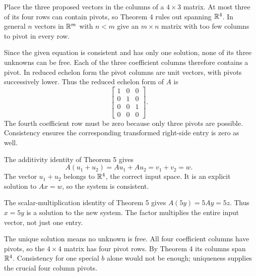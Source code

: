 Place the three proposed vectors in the columns of a $4\times3$
matrix. At most three of its four rows can contain pivots, so Theorem 4
rules out spanning $\mathbb{R}^4$. In general $n$ vectors in $\mathbb{R}^m$ with
$n<m$ give an $m\times n$ matrix with too few columns to pivot in
every row.

Since the given equation is consistent and has only one solution,
none of its three unknowns can be free. Each of the three coefficient
columns therefore contains a pivot. In reduced echelon form the
pivot columns are unit vectors, with pivots successively lower.
Thus the reduced echelon form of $A$ is
\[\begin{bmatrix}1&0&0\\0&1&0\\0&0&1\\0&0&0\end{bmatrix}.\]
The fourth coefficient row must be zero because only three pivots
are possible. Consistency ensures the corresponding transformed
right-side entry is zero as well.

The additivity identity of Theorem 5 gives
\[A(u_1+u_2)=Au_1+Au_2=v_1+v_2=w.\]
The vector $u_1+u_2$ belongs to $\mathbb{R}^4$, the correct input space.
It is an explicit solution to $Ax=w$, so the system is consistent.

The scalar-multiplication identity of Theorem 5 gives
$A(5y)=5Ay=5z$. Thus $x=5y$ is a solution to the new system.
The factor multiplies the entire input vector, not just one entry.

The unique solution means no unknown is free. All four coefficient
columns have pivots, so the $4\times4$ matrix has four pivot rows.
By Theorem 4 its columns span $\mathbb{R}^4$. Consistency for one special
$b$ alone would not be enough; uniqueness supplies the crucial four
column pivots.

